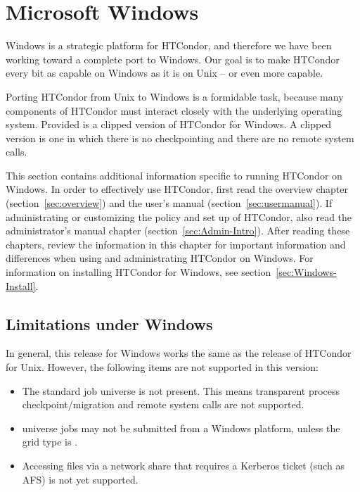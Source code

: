 \section{\label{sec:platform-windows}Microsoft Windows}

Windows is a strategic platform for HTCondor,
and therefore we have been working toward a complete
port to Windows.
Our goal is to make HTCondor every bit as capable on Windows as it is on
Unix -- or even more capable.

Porting HTCondor from Unix to Windows is a formidable task,
because many
components of HTCondor must interact closely with the underlying operating
system.
Provided is a clipped version of HTCondor for Windows.
A clipped version is one in which there is no checkpointing
and there are no remote system calls.

This section contains additional information specific to running
HTCondor on Windows.
In order to effectively use HTCondor, first read the overview
chapter (section~\ref{sec:overview})
and the user's manual (section~\ref{sec:usermanual}).
If administrating or customizing the policy and set up of HTCondor,
also read the administrator's manual 
chapter (section~\ref{sec:Admin-Intro}).
After reading these chapters,
review the information in this chapter for
important information and differences when using and administrating
HTCondor on Windows.
For information on installing HTCondor for Windows, see
section~\ref{sec:Windows-Install}.



\subsection{Limitations under Windows}

In general, this release for Windows works the same as the 
release of HTCondor for Unix.
However, the following items are not supported in this version:

\begin{itemize}

\item The standard job universe is not present.  This means
transparent process checkpoint/migration and remote system calls are
not supported.

\item {} universe jobs may not be submitted from a
Windows platform, unless the grid type is .

\item Accessing files via a network share that requires a Kerberos ticket
(such as AFS) is not yet supported.

\end{itemize}

